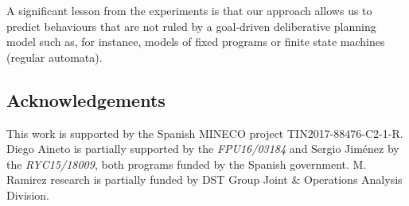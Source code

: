 \documentclass[letterpaper]{article} %
\newcommand{\strips}{\textsc{Strips}}     %
\begin{document}
A significant lesson from the experiments is that our approach allows us to predict behaviours that are not ruled by a goal-driven deliberative planning model such as, for instance, models of fixed programs or finite state machines (regular automata).


















\subsection*{Acknowledgements}
This work is supported by the Spanish MINECO project TIN2017-88476-C2-1-R. Diego Aineto is partially supported by the {\it FPU16/03184} and Sergio Jim\'enez by the {\it RYC15/18009}, both programs funded by the Spanish government. M. Ramirez research is partially funded by DST Group Joint \& Operations Analysis Division.



\end{document}
